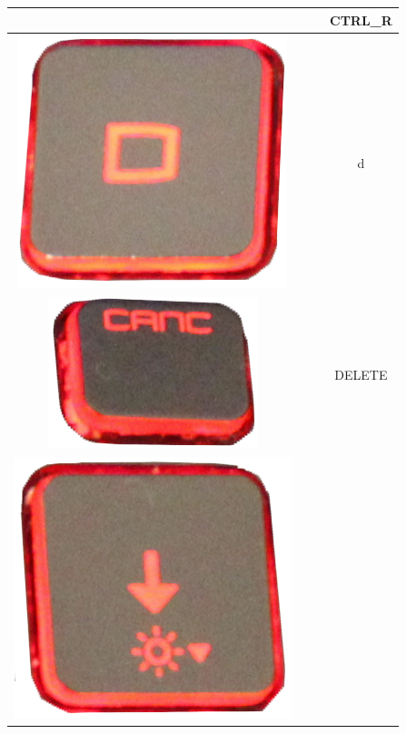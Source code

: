 \begin{longtable}{cccc}
\begin{minipage}[c]{.3\textwidth}
\vspace{0.2cm}
\end{minipage} & & & CTRL\_R\\
\hline
\begin{minipage}[c]{.3\textwidth}
\vspace{0.2cm}
\includegraphics[scale=0.1]{Images/KeyMapping/d}
\vspace{0.2cm}
\end{minipage} & & & d\\
\hline
\begin{minipage}[c]{.3\textwidth}
\vspace{0.2cm}
\includegraphics[scale=0.1]{Images/KeyMapping/DELETE}
\vspace{0.2cm}
\end{minipage} & & & DELETE\\
\hline
\begin{minipage}[c]{.3\textwidth}
\vspace{0.2cm}
\includegraphics[scale=0.1]{Images/KeyMapping/DOWN}

\end{minipage}
\end{longtable}
